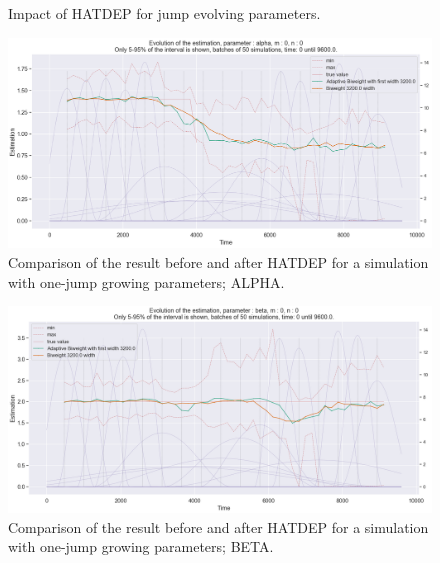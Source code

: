 \begin{figure}
\centering
{} 
\caption{Impact of HATDEP for  jump evolving parameters.}
\label{fig:compar_kernels_2}
\end{figure}

\begin{figure}
\centering
\includegraphics[width = 0.90 \textwidth]{../imag/chap3/2/1.png}
\caption{Comparison of the result before and after HATDEP for a simulation with one-jump growing parameters; ALPHA.}
\label{fig:first_estimate_2_alpha}
\end{figure}

\begin{figure}
\centering
\includegraphics[width = 0.90 \textwidth]{../imag/chap3/2/2.png}
\caption{Comparison of the result before and after HATDEP for a simulation with one-jump growing parameters; BETA.}
\label{fig:first_estimate_2_beta}
\end{figure}


